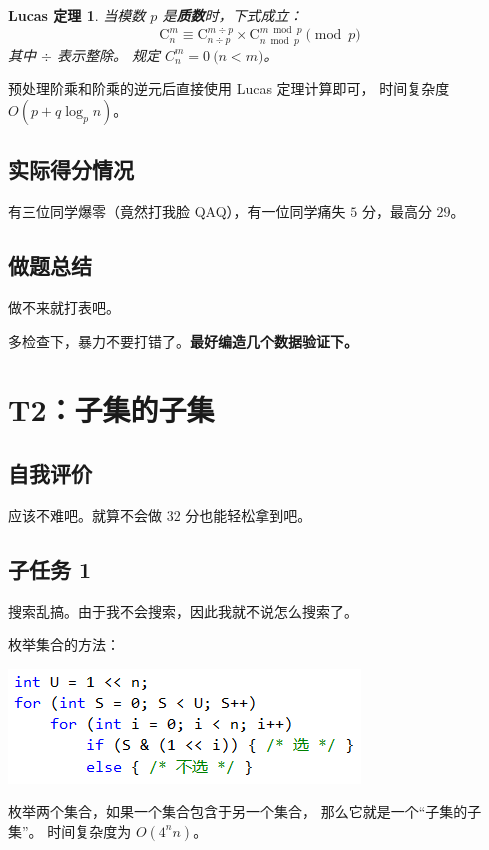 \documentclass[UTF8]{article}
\newtheorem*{Lucas}{Lucas 定理}
\begin{document}
	\begin{Lucas}
		当模数 $p$ 是\textbf{质数}时，下式成立：
		$$
		\mathrm{C}_{n}^{m} \equiv \mathrm{C}_{n \div p}^{m \div p}
		\times \mathrm{C}_{n \bmod p}^{m \bmod p}
		\pmod p
		$$
		其中 $\div$ 表示整除。
		规定 $C_{n}^{m} = 0 \pod {n < m}$。
	\end{Lucas}

	预处理阶乘和阶乘的逆元后直接使用 Lucas 定理计算即可，
	时间复杂度 $O(p + q \log_p n)$。

	\subsection{实际得分情况}

	有三位同学爆零（竟然打我脸 QAQ），有一位同学痛失 $5$ 分，最高分 $29$。

	\subsection{做题总结}

	做不来就打表吧。

	多检查下，暴力不要打错了。\textbf{最好编造几个数据验证下。}

	\section{T2：子集的子集}

	\subsection{自我评价}

	应该不难吧。就算不会做 $32$ 分也能轻松拿到吧。

	\subsection{子任务 1}

	搜索乱搞。由于我不会搜索，因此我就不说怎么搜索了。
	
	枚举集合的方法：

	\includegraphics[scale=0.65]{pic/pic1.png}

	枚举两个集合，如果一个集合包含于另一个集合，
	那么它就是一个``子集的子集''。
	时间复杂度为 $O(4^n n)$。
\end{document}

